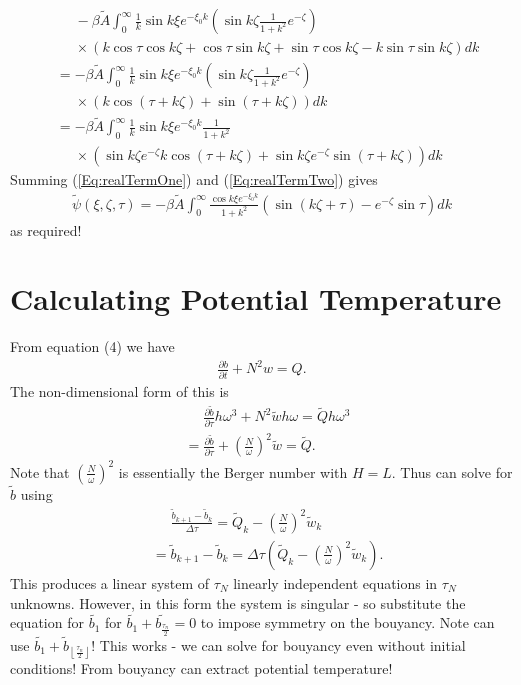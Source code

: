 \documentclass[12pt]{article}
\begin{document}
\begin{align}
&\phantom{=} -\beta \tilde{A} \int_{0}^{\infty} \frac{1}{k} \sin k\xi e^{-\xi_0 k}\left(\sin k \zeta \frac{1}{1+k^2}e^{-\zeta} \right) \\
&\phantom{=}\times \left( k\cos\tau\cos k\zeta + \cos\tau\sin k\zeta + \sin\tau\cos k\zeta -k\sin\tau\sin k\zeta \right) dk \\
&= -\beta \tilde{A} \int_{0}^{\infty} \frac{1}{k} \sin k\xi e^{-\xi_0 k}\left(\sin k \zeta \frac{1}{1+k^2}e^{-\zeta} \right) \\
&\phantom{=}\times \left(k\cos\left(\tau + k\zeta\right) + \sin\left(\tau+k\zeta \right) \right) dk \\
&= -\beta \tilde{A} \int_{0}^{\infty} \frac{1}{k} \sin k\xi e^{-\xi_0 k}\frac{1}{1+k^2} \\
&\phantom{=} \times\left(\sin k \zeta e^{-\zeta} k \cos\left(\tau+k\zeta \right) + \sin k \zeta e^{-\zeta}\sin\left(\tau+k\zeta \right) \right) dk \label{Eq:realTermTwo}
\end{align}
Summing (\ref{Eq:realTermOne}) and (\ref{Eq:realTermTwo}) gives
\begin{align}
\tilde{\psi} (\xi,\zeta,\tau) = -\beta \tilde{A} \int_0^\infty \frac{\cos k\xi e^{-\xi_0 k }}{1+k^2} \left(\sin(k\zeta + \tau) - e^{-\zeta}\sin\tau \right) dk
\end{align}
as required!

\section{Calculating Potential Temperature}
From equation (4) \citet{rotunno83} we have 
\begin{align*}
\frac{\partial b}{\partial t} + N^2 w = Q. 
\end{align*}
The non-dimensional form of this is
\begin{align*}
& \phantom{=} \frac{\partial \tilde{b}}{\partial \tau}h \omega^3 + N^2 \tilde{w}h\omega = \tilde{Q}h\omega^3 \\
& = \frac{\partial \tilde{b}}{\partial \tau} + \left(\frac{N}{\omega}\right)^2 \tilde{w} = \tilde{Q}. 
\end{align*}
Note that $\left(\frac{N}{\omega}\right)^2$ is essentially the Berger number with $H=L$. Thus can solve for $\tilde{b}$ using
\begin{align*}
&\phantom{=} \frac{\tilde{b}_{k+1}-\tilde{b}_{k}}{\Delta \tau} = \tilde{Q}_k - \left(\frac{N}{\omega}\right)^2 \tilde{w}_k \\
&= \tilde{b}_{k+1}-\tilde{b}_{k} = \Delta \tau\left(\tilde{Q}_k - \left(\frac{N}{\omega}\right)^2 \tilde{w}_k \right).
\end{align*}
This produces a linear system of $\tau_N$ linearly independent equations in $\tau_N$ unknowns. However, in this form the system is singular - so substitute the equation for $\tilde{b_1}$ for $\tilde{b_1}+\tilde{b_\frac{\tau_n}{2}}=0$ to impose symmetry on the bouyancy. Note can use $\tilde{b_1}+\tilde{b}_{\left\lfloor\frac{\tau_n}{2}\right\rfloor}$! This works - we can solve for bouyancy even without initial conditions! From bouyancy can extract potential temperature!
\end{document}
